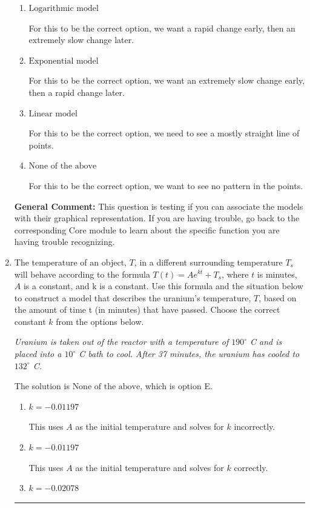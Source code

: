 \documentclass{extbook}[14pt]
\newcommand{\litem}[1]{\item #1

\rule{\textwidth}{0.4pt}}
\begin{document}
\begin{enumerate}
{\begin{enumerate}[label=\Alph*.]
For this to be the correct option, we need to see a polynomial or rational shape.
\item \( \text{Logarithmic model} \)

For this to be the correct option, we want a rapid change early, then an extremely slow change later.
\item \( \text{Exponential model} \)

For this to be the correct option, we want an extremely slow change early, then a rapid change later.
\item \( \text{Linear model} \)

For this to be the correct option, we need to see a mostly straight line of points.
\item \( \text{None of the above} \)

For this to be the correct option, we want to see no pattern in the points.
\end{enumerate}

\textbf{General Comment:} This question is testing if you can associate the models with their graphical representation. If you are having trouble, go back to the corresponding Core module to learn about the specific function you are having trouble recognizing.
}
\litem{
The temperature of an object, $T$, in a different surrounding temperature $T_s$ will behave according to the formula $T(t) = Ae^{kt} + T_s$, where $t$ is minutes, $A$ is a constant, and k is a constant. Use this formula and the situation below to construct a model that describes the uranium's temperature, $T$, based on the amount of time t (in minutes) that have passed. Choose the correct constant $k$ from the options below.

\begin{center}
    \textit{ Uranium is taken out of the reactor with a temperature of $190^{\circ}$ C and is placed into a $10^{\circ}$ C bath to cool. After 37 minutes, the uranium has cooled to $132^{\circ}$ C. }
\end{center}


The solution is \( \text{None of the above} \), which is option E.\begin{enumerate}[label=\Alph*.]
\item \( k = -0.01197 \)

This uses $A$ as the initial temperature and solves for $k$ incorrectly.
\item \( k = -0.01197 \)

This uses $A$ as the initial temperature and solves for $k$ correctly.
\item \( k = -0.02078 \)


\end{enumerate}}
\end{enumerate}
\end{document}

